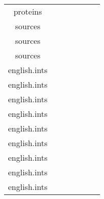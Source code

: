 \begin{table}[h]
\begin{center}
\begin{tabular}{crrrrrr}
proteins \\
sources \\
sources \\
sources \\
english.ints \\
english.ints \\
english.ints \\
english.ints \\
english.ints \\
english.ints \\
english.ints \\
english.ints \\
english.ints \\
\bottomrule
\end{tabular}
\caption{}
\label{tab:sparsity}
\end{center}
\end{table}
